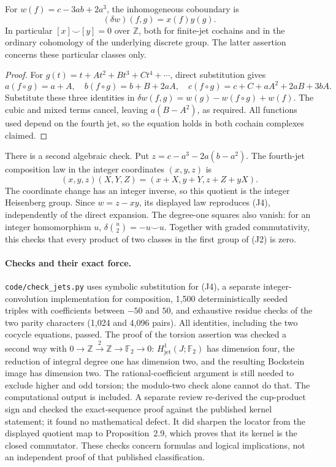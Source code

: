 \begin{proposition}\ours
For \(w(f)=c-3ab+2a^3\), the inhomogeneous coboundary is
\[
 (\delta w)(f,g)=x(f)y(g).                  \tag{J4}
\]
In particular \([x]\smile[y]=0\) over \(\mathbb Z\), both for finite-jet
cochains and in the ordinary cohomology of the underlying discrete group.
The latter assertion concerns these particular classes only.
\end{proposition}
\begin{proof}
For \(g(t)=t+At^2+Bt^3+Ct^4+\cdots\), direct substitution gives
\[
 a(f\circ g)=a+A,\quad
 b(f\circ g)=b+B+2aA,\quad
 c(f\circ g)=c+C+aA^2+2aB+3bA.
\]
Substitute these three identities in
\(\delta w(f,g)=w(g)-w(f\circ g)+w(f)\).
The cubic and mixed terms cancel, leaving \(a(B-A^2)\), as required.
All functions used depend on the fourth jet, so the equation holds in
both cochain complexes claimed.
\end{proof}

There is a second algebraic check. Put
\(z=c-a^3-2a(b-a^2)\). The fourth-jet composition law in the integer
coordinates \((x,y,z)\) is
\[
 (x,y,z)(X,Y,Z)=(x+X,y+Y,z+Z+yX).
\]
The coordinate change has an integer inverse, so this quotient is the
integer Heisenberg group. Since \(w=z-xy\), its displayed law reproduces
(J4), independently of the direct expansion. The degree-one squares also
vanish: for an integer homomorphism \(u\),
\(\delta\binom{u}{2}=-u\smile u\). Together with graded commutativity,
this checks that every product of two classes in the first group of (J2)
is zero.

\paragraph{Checks and their exact force.}
\texttt{code/check\_jets.py} uses symbolic substitution for (J4), a separate
integer-convolution implementation for composition, 1,500 deterministically
seeded triples with coefficients between \(-50\) and \(50\), and exhaustive
residue checks of the two parity characters (1,024 and 4,096 pairs).
All identities, including the two cocycle equations, passed. The proof of
the torsion assertion was checked a second way with
\(0\to\mathbb Z\xrightarrow{\,2\,}\mathbb Z\to\mathbb F_2\to0\):
\(H^1_{\mathrm{jet}}(J;\mathbb F_2)\) has dimension four, the reduction of
integral degree one has dimension two, and the resulting Bockstein image
has dimension two. The rational-coefficient argument is still needed to
exclude higher and odd torsion; the modulo-two check alone cannot do that.
The computational output is included. A separate review re-derived the
cup-product sign and checked the exact-sequence proof against the published
kernel statement; it found no mathematical defect. It did sharpen the
locator from the displayed quotient map to Proposition~2.9, which proves
that its kernel is the closed commutator. These checks concern formulas and
logical implications, not an independent proof of that published classification.

